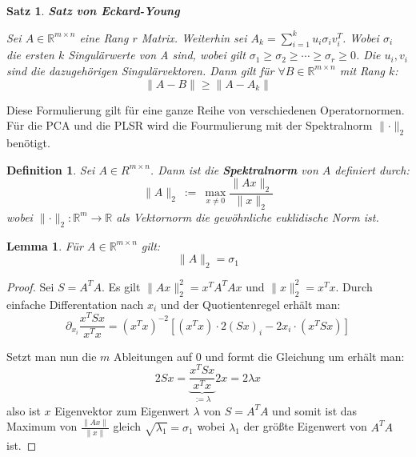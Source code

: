 \documentclass{article}
\newcommand{\R}[0]{\mathbb{R}}
\newtheorem{defin}{Definition}
\newtheorem{lemma}{Lemma}
\newtheorem{thm}{Satz}
\begin{document}
\begin{thm} \textbf{Satz von Eckard-Young}
    
    Sei $A \in \R^{m\times n}$ eine Rang $r$ Matrix. Weiterhin sei $A_k = \sum\limits_{i=1}^k u_i\sigma_iv_i^T$. 
    Wobei $\sigma_i$ die ersten $k$ Singulärwerte von A sind, wobei gilt $\sigma_1 \geq \sigma_2 \geq \cdots \geq \sigma_r \geq 0$. Die $u_i, v_i$ sind die dazugehörigen Singulärvektoren. 
    Dann gilt für $\forall B \in \R^{m \times n}$ mit Rang $k$:
    \begin{equation}
        \lVert A - B \rVert \geq \lVert A - A_k \rVert
    \end{equation}
\end{thm}

Diese Formulierung gilt für eine ganze Reihe von verschiedenen Operatornormen.
Für die PCA und die PLSR wird die Fourmulierung mit der Spektralnorm $\lVert \cdot \rVert_2$ benötigt.

\begin{defin}
    Sei $A \in R^{m \times n}$. Dann ist die \textbf{Spektralnorm} von $A$ definiert durch:
    \begin{equation}
        \lVert A \rVert_2 \: := \: \max\limits_{x \neq 0} \frac{\lVert Ax \rVert_2}{\lVert x \rVert_2}
    \end{equation}
    wobei $\lVert \cdot \rVert_2: \R^m \to \R$ als Vektornorm die gewöhnliche euklidische Norm ist.
\end{defin}

\begin{lemma}
    Für $A \in \R^{m \times n}$ gilt:
    \begin{equation}
        \lVert A \rVert_2 = \sigma_1
    \end{equation}
\end{lemma}

\begin{proof}
    Sei $S = A^TA$. Es gilt $\lVert Ax \rVert_2^2 = x^TA^TAx$ und $\lVert x \rVert_2^2 = x^Tx$.
    Durch einfache Differentation nach $x_i$ und der Quotientenregel erhält man:
    \begin{equation}
        \partial_{x_i}\frac{x^TSx}{x^Tx} = (x^Tx)^{-2}\left[ (x^Tx) \cdot 2(Sx)_i - 2x_i \cdot (x^TSx) \right]
    \end{equation}

    Setzt man nun die $m$ Ableitungen auf $0$ und formt die Gleichung um erhält man:
    \begin{equation}
        2Sx = \underbrace{\frac{x^TSx}{x^Tx}}_{:= \lambda} 2x = 2\lambda x
    \end{equation}
    also ist $x$ Eigenvektor zum Eigenwert $\lambda$ von $S = A^TA$ und
    somit ist das Maximum von $\frac{\lVert Ax \rVert}{\lVert x \rVert}$ gleich $\sqrt{\lambda_1} = \sigma_1$ wobei $\lambda_1$ der größte Eigenwert von $A^TA$ ist.
\end{proof}
\end{document}
